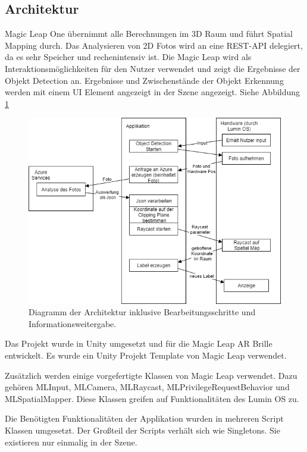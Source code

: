 \subsection{Architektur}

Magic Leap One übernimmt alle Berechnungen im 3D Raum und führt Spatial Mapping durch. Das Analysieren von 2D Fotos wird an eine REST-API delegiert, da es sehr Speicher und rechenintensiv ist. Die Magic Leap wird als Interaktionsmöglichkeiten für den Nutzer verwendet und zeigt die Ergebnisse der Objekt Detection an. Ergebnisse und Zwischenstände der Objekt Erkennung werden mit einem UI Element angezeigt in der Szene angezeigt. Siehe Abbildung \ref{dia:flow} %

\begin{figure}[H]
	\centering
	\includegraphics[width=1\textwidth]{images/dia_flow.png}
	\caption[]{Diagramm der Architektur inklusive Bearbeitungsschritte und Informationsweitergabe.}
	\label{dia:flow}
\end{figure}

Das Projekt wurde in Unity umgesetzt und für die Magic Leap AR Brille entwickelt.
Es wurde ein Unity Projekt Template von Magic Leap verwendet. 

Zusätzlich werden einige vorgefertigte Klassen von Magic Leap verwendet. Dazu gehören MLInput, MLCamera, MLRaycast, MLPrivilegeRequestBehavior und MLSpatialMapper. Diese Klassen greifen auf Funktionalitäten des Lumin OS zu.

Die Benötigten Funktionalitäten der Applikation wurden in mehreren Script Klassen umgesetzt. Der Großteil der Scripts
 verhält sich wie Singletons. Sie existieren nur einmalig in der Szene.

